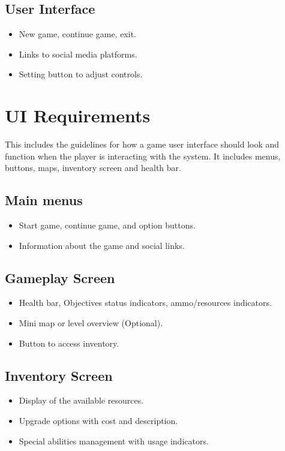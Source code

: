 \subsection{User Interface}
\begin{itemize}
	\item 	New game, continue game, exit.
	\item 	Links to social media platforms.
	\item 	Setting button to adjust controls.
\end{itemize}
\section{UI Requirements}
This includes the guidelines for how a game user interface should look and function when the player is interacting with the system. It includes menus, buttons, maps, inventory screen and health bar.
\subsection{Main menus}
\begin{itemize}
	\item	Start game, continue game, and option buttons.
	\item	Information about the game and social links.
\end{itemize}
\subsection{Gameplay Screen}
\begin{itemize}
	\item 	Health bar, Objectives status indicators, ammo/resources indicators.
	\item 	Mini map or level overview (Optional).
	\item 	Button to access inventory.
\end{itemize}
\subsection{Inventory Screen}
\begin{itemize}
	\item	Display of the available resources.
	\item 	Upgrade options with cost and description.
	\item 	Special abilities management with usage indicators.
\end{itemize}
